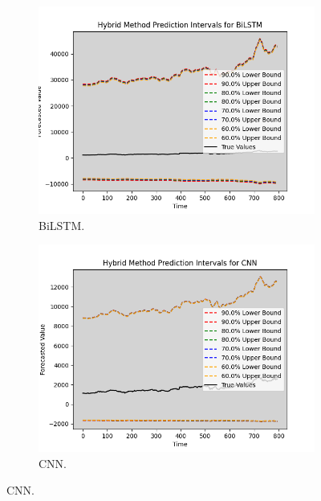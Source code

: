 \begin{figure}[H]
\begin{minipage}{0.45\textwidth}
        \label{F 4.1}
    \end{minipage}
    \hfill
    \begin{minipage}{0.45\textwidth}
        \centering
        \begin{subfigure}[b]{\textwidth}
            \centering
            \includegraphics[width=\textwidth]{Chap03/figs/BiLSTM_hybrid_method_plot_AsianPaint_Method2.png}
            \caption{BiLSTM.}
        \end{subfigure}
        \hfill
        \begin{subfigure}[b]{\textwidth}
            \centering
            \includegraphics[width=\textwidth]{Chap03/figs/CNN_hybrid_method_plot_AsianPaint_Method2.png}
            \caption{CNN.}

\end{subfigure}
\end{minipage}
\end{figure}
